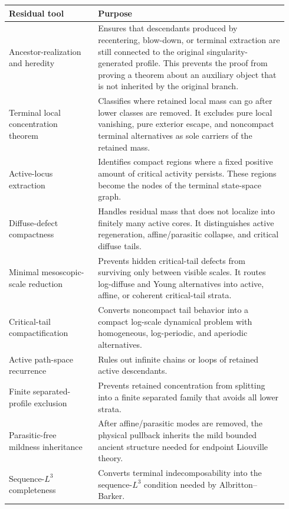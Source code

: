 \documentclass[11pt]{amsart}
\begin{document}
\begin{longtable}{@{}>{\raggedright\arraybackslash}p{0.30\linewidth}>{\raggedright\arraybackslash}p{0.64\linewidth}@{}}
\toprule
\textbf{Residual tool} & \textbf{Purpose} \\
\midrule
\endhead
Ancestor-realization and heredity & Ensures that descendants produced by recentering, blow-down, or terminal extraction are still connected to the original singularity-generated profile. This prevents the proof from proving a theorem about an auxiliary object that is not inherited by the original branch. \\
Terminal local concentration theorem & Classifies where retained local mass can go after lower classes are removed. It excludes pure local vanishing, pure exterior escape, and noncompact terminal alternatives as sole carriers of the retained mass. \\
Active-locus extraction & Identifies compact regions where a fixed positive amount of critical activity persists. These regions become the nodes of the terminal state-space graph. \\
Diffuse-defect compactness & Handles residual mass that does not localize into finitely many active cores. It distinguishes active regeneration, affine/parasitic collapse, and critical diffuse tails. \\
Minimal mesoscopic-scale reduction & Prevents hidden critical-tail defects from surviving only between visible scales. It routes log-diffuse and Young alternatives into active, affine, or coherent critical-tail strata. \\
Critical-tail compactification & Converts noncompact tail behavior into a compact log-scale dynamical problem with homogeneous, log-periodic, and aperiodic alternatives. \\
Active path-space recurrence & Rules out infinite chains or loops of retained active descendants. \\
Finite separated-profile exclusion & Prevents retained concentration from splitting into a finite separated family that avoids all lower strata. \\
Parasitic-free mildness inheritance & After affine/parasitic modes are removed, the physical pullback inherits the mild bounded ancient structure needed for endpoint Liouville theory. \\
Sequence-\(L^3\) completeness & Converts terminal indecomposability into the sequence-\(L^3\) condition needed by Albritton--Barker. \\
\bottomrule
\end{longtable}
\end{document}
